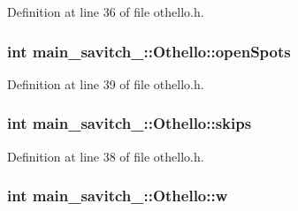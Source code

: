 Definition at line 36 of file othello.\+h.

\subsubsection[{\texorpdfstring{open\+Spots}{openSpots}}]{\setlength{\rightskip}{0pt plus 5cm}int main\+\_\+savitch\+\_\+::\+Othello\+::open\+Spots\hspace{0.3cm}{\ttfamily [protected]}}\hypertarget{classmain__savitch__14_1_1_othello_a15045e3e94c34afe08240885e230d502}{}\label{classmain__savitch__14_1_1_othello_a15045e3e94c34afe08240885e230d502}


Definition at line 39 of file othello.\+h.

\subsubsection[{\texorpdfstring{skips}{skips}}]{\setlength{\rightskip}{0pt plus 5cm}int main\+\_\+savitch\+\_\+::\+Othello\+::skips\hspace{0.3cm}{\ttfamily [protected]}}\hypertarget{classmain__savitch__14_1_1_othello_a85d4ce17512d8dbf85a313a27eea0644}{}\label{classmain__savitch__14_1_1_othello_a85d4ce17512d8dbf85a313a27eea0644}


Definition at line 38 of file othello.\+h.

\subsubsection[{\texorpdfstring{w}{w}}]{\setlength{\rightskip}{0pt plus 5cm}int main\+\_\+savitch\+\_\+::\+Othello\+::w\hspace{0.3cm}{\ttfamily [protected]}}\hypertarget{classmain__savitch__14_1_1_othello_a1b11c5fe33e30a94ed39e8cb55caf37e}{}\label{classmain__savitch__14_1_1_othello_a1b11c5fe33e30a94ed39e8cb55caf37e}


